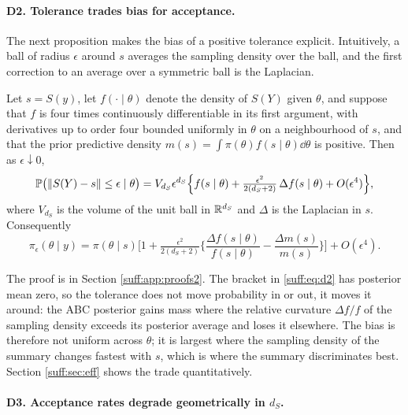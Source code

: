 \paragraph{D2. Tolerance trades bias for acceptance.} The next proposition makes the bias of a
positive tolerance explicit. Intuitively, a ball of radius $\epsilon$ around $s$ averages the
sampling density over the ball, and the first correction to an average over a symmetric ball
is the Laplacian.

\begin{proposition}
\label{suff:prop:d2}
Let $s=S(y)$, let $f(\cdot\mid\theta)$ denote the density of $S(Y)$ given $\theta$, and
suppose that $f$ is four times continuously differentiable in its first argument, with
derivatives up to order four bounded uniformly in $\theta$ on a neighbourhood of $s$, and that
the prior predictive density $m(s)=\int\pi(\theta)f(s\mid\theta)\dd\theta$ is positive.
Then as $\epsilon\downarrow0$,
\[
\mathbb{P}\big(\|S(Y)-s\|\le\epsilon\mid\theta\big)
= V_{d_S}\epsilon^{d_S}\Big\{f(s\mid\theta)+\tfrac{\epsilon^2}{2(d_S+2)}\,
\Delta f(s\mid\theta)+O(\epsilon^{4})\Big\},
\]
where $V_{d_S}$ is the volume of the unit ball in $\mathbb{R}^{d_S}$ and $\Delta$ is the Laplacian in
$s$. Consequently
\begin{equation}
\pi_\epsilon(\theta\mid y)=\pi(\theta\mid s)\Big[1+\tfrac{\epsilon^2}{2(d_S+2)}
\Big\{\frac{\Delta f(s\mid\theta)}{f(s\mid\theta)}-\frac{\Delta m(s)}{m(s)}\Big\}\Big]
+O(\epsilon^4).
\label{suff:eq:d2}
\end{equation}
\end{proposition}

The proof is in Section \ref{suff:app:proofs2}. The bracket in \eqref{suff:eq:d2} has
posterior mean zero, so the tolerance does not move probability in or out, it moves it
around: the ABC posterior gains mass where the relative curvature $\Delta f/f$ of the
sampling density exceeds its posterior average and loses it elsewhere. The bias is therefore
not uniform across $\theta$; it is largest where the sampling density of the summary changes
fastest with $s$, which is where the summary discriminates best. Section \ref{suff:sec:eff}
shows the trade quantitatively.

\paragraph{D3. Acceptance rates degrade geometrically in $d_S$.}

